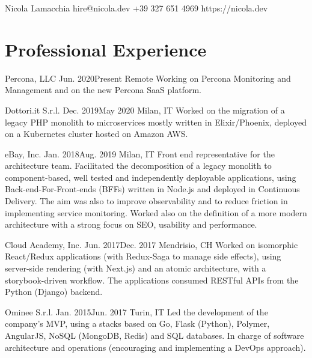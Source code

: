 \documentclass{resume}
\begin{document}
\heading%
    {Nicola}
    {Lamacchia}
    {}
    {hire@nicola.dev}%
    {+39 327 651 4969}%
    {https://nicola.dev}

\separator[cvlightgray]


\section{Professional Experience}

%
    {Percona, LLC}%
    {Jun. 2020}{Present}%
    {Remote}%
    {Working on Percona Monitoring and Management and on the new Percona SaaS
        platform.}

%
    {Dottori.it S.r.l.}%
    {Dec. 2019}{May 2020}%
    {Milan, IT}%
    {Worked on the migration of a legacy PHP monolith to microservices mostly
        written in Elixir/Phoenix, deployed on a Kubernetes cluster hosted on
        Amazon AWS.}

%
    {eBay, Inc.}%
    {Jan. 2018}{Aug. 2019}%
    {Milan, IT}%
    {Front end representative for the architecture team. Facilitated the
        decomposition of a legacy monolith to component-based, well tested and
        independently deployable applications, using Back-end-For-Front-ends
        (BFFs) written in Node.js and deployed in Continuous Delivery. The aim
        was also to improve observability and to reduce friction in
        implementing service monitoring. Worked also on the definition of a
        more modern architecture with a strong focus on SEO, usability and
        performance.}

%
    {Cloud Academy, Inc.}%
    {Jun. 2017}{Dec. 2017}%
    {Mendrisio, CH}%
    {Worked on isomorphic React/Redux applications (with Redux-Saga to manage
        side effects), using server-side rendering (with Next.js) and an atomic
        architecture, with a storybook-driven workflow. The applications
        consumed RESTful APIs from the Python (Django) backend.}

%
    {Ominee S.r.l.}%
    {Jan. 2015}{Jun. 2017}%
    {Turin, IT}%
    {Led the development of the company’s MVP, using a stacks based on Go,
        Flask (Python), Polymer, AngularJS, NoSQL (MongoDB, Redis) and SQL
        databases. In charge of software architecture and operations
        (encouraging and implementing a DevOps approach).}
\end{document}

